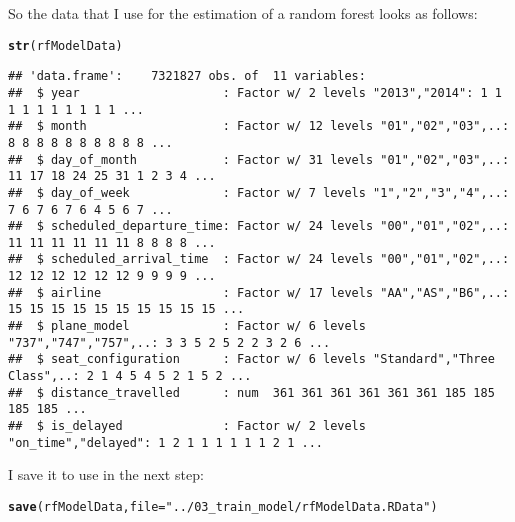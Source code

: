 \documentclass{article}\usepackage[]{graphicx}\usepackage[]{color}
\makeatletter
\newcommand{\hlstr}[1]{\textcolor[rgb]{0.192,0.494,0.8}{#1}}%
\newcommand{\hlstd}[1]{\textcolor[rgb]{0.345,0.345,0.345}{#1}}%
\newcommand{\hlkwc}[1]{\textcolor[rgb]{0.333,0.667,0.333}{#1}}%
\newcommand{\hlkwd}[1]{\textcolor[rgb]{0.737,0.353,0.396}{\textbf{#1}}}%
\newenvironment{kframe}{%
 \def\at@end@of@kframe{}%
 \ifinner\ifhmode%
  \def\at@end@of@kframe{\end{minipage}}%
  \begin{minipage}{\columnwidth}%
 \fi\fi%
 \def\FrameCommand##1{\hskip\@totalleftmargin \hskip-\fboxsep
 \colorbox{shadecolor}{##1}\hskip-\fboxsep
     \hskip-\linewidth \hskip-\@totalleftmargin \hskip\columnwidth}%
 \MakeFramed {\advance\hsize-\width
   \@totalleftmargin\z@ \linewidth\hsize
   \@setminipage}}%
 {\par\unskip\endMakeFramed%
 \at@end@of@kframe}
\newenvironment{knitrout}{}{} %
\makeatother
\begin{document}
So the data that I use for the estimation of a random forest looks as follows:
\begin{knitrout}
\color{fgcolor}\begin{kframe}
\begin{alltt}
\hlkwd{str}\hlstd{(rfModelData)}
\end{alltt}
\begin{verbatim}
## 'data.frame':	7321827 obs. of  11 variables:
##  $ year                    : Factor w/ 2 levels "2013","2014": 1 1 1 1 1 1 1 1 1 1 ...
##  $ month                   : Factor w/ 12 levels "01","02","03",..: 8 8 8 8 8 8 8 8 8 8 ...
##  $ day_of_month            : Factor w/ 31 levels "01","02","03",..: 11 17 18 24 25 31 1 2 3 4 ...
##  $ day_of_week             : Factor w/ 7 levels "1","2","3","4",..: 7 6 7 6 7 6 4 5 6 7 ...
##  $ scheduled_departure_time: Factor w/ 24 levels "00","01","02",..: 11 11 11 11 11 11 8 8 8 8 ...
##  $ scheduled_arrival_time  : Factor w/ 24 levels "00","01","02",..: 12 12 12 12 12 12 9 9 9 9 ...
##  $ airline                 : Factor w/ 17 levels "AA","AS","B6",..: 15 15 15 15 15 15 15 15 15 15 ...
##  $ plane_model             : Factor w/ 6 levels "737","747","757",..: 3 3 5 2 5 2 2 3 2 6 ...
##  $ seat_configuration      : Factor w/ 6 levels "Standard","Three Class",..: 2 1 4 5 4 5 2 1 5 2 ...
##  $ distance_travelled      : num  361 361 361 361 361 361 185 185 185 185 ...
##  $ is_delayed              : Factor w/ 2 levels "on_time","delayed": 1 2 1 1 1 1 1 1 2 1 ...
\end{verbatim}
\end{kframe}
\end{knitrout}

I save it to use in the next step:
\begin{knitrout}
\color{fgcolor}\begin{kframe}
\begin{alltt}
\hlkwd{save}\hlstd{(rfModelData,} \hlkwc{file}\hlstd{=}\hlstr{"../03_train_model/rfModelData.RData"}\hlstd{)}
\end{alltt}
\end{kframe}
\end{knitrout}
\end{document}
